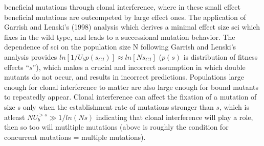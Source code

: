 \documentclass[12pt, two column]{article}
\begin{document}
 beneficial mutations through clonal interference, where in these small effect beneficial mutations are outcompeted by large effect ones.  The application of Garrish and Lenski's (1998) analysis which derives a minimal effect size sci which fixes in the wild type, and leads to a successional mutation behavior.  The dependence of sci on the population size N following Garrish and Lenski's analysis provides $ln[1/U_b p(s_{CI})]\approx ln[Ns_{CI}]$ ($p(s)$ is distribution of fitness effects “$s$”), which makes a crucial and incorrect assumption in which double mutants do not occur, and results in incorrect predictions. Populations large enough for clonal interference to matter are also large enough for bound mutants to repeatedly appear.  Clonal interference can affect the fixation of a mutation of size s only when the establishment rate of  mutations stronger than $s$, which is atleast $NU_b^{>s} \gg 1/ln(Ns)$ indicating that clonal interference will play a role, then so too will mutltiple mutations (above is roughly the condition for concurrent mutations = multiple mutations). 



\end{document}
